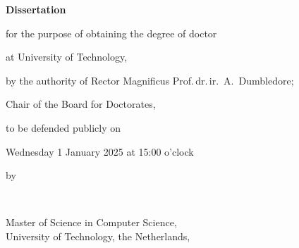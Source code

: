 \begin{titlepage}



\thispagestyle{empty}
\begin{center}

\printtitle

\end{center}

\cleardoublepage




\thispagestyle{empty}
\begin{center}

\printtitle


\vfill

{\Large\titlefont\bfseries Dissertation}

\bigskip
\bigskip

for the purpose of obtaining the degree of doctor

at University of Technology,

by the authority of Rector Magnificus Prof.\,dr.\,ir.\ A.\ Dumbledore;

Chair of the Board for Doctorates,

to be defended publicly on

Wednesday 1 January 2025 at 15:00 o'clock

\bigskip
\bigskip

by

\bigskip
\bigskip

\makeatletter
{\Large\titlefont\bfseries\@firstname\ \titleshape{\MakeUppercase{\@lastname}}}
\makeatother

\bigskip
\bigskip

Master of Science in Computer Science, \\
University of Technology, the Netherlands,


\end{center}
\end{titlepage}
